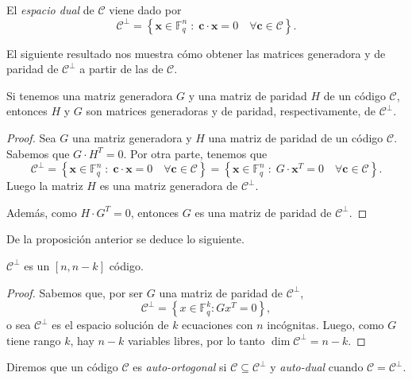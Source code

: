 \begin{definition}
    El \emph{espacio dual} de $\mathcal{C}$ viene dado por 
    \[
        \mathcal{C} ^{\perp} = \left\{ \mathbf{x} \in \mathbb{F}_q^n \; : \; \mathbf{c} \cdot \mathbf{x} = 0 \quad \forall \mathbf{c} \in \mathcal{C} \right\}.
    \]
\end{definition}

El siguiente resultado nos muestra cómo obtener las matrices generadora y de paridad de $\mathcal{C} ^{\perp}$ a partir de las de $\mathcal{C}$.

\begin{proposition}
    Si tenemos una matriz generadora $G$ y una matriz de paridad $H$ de un código $\mathcal{C}$, entonces $H$ y $G$ son matrices generadoras y de paridad, respectivamente, de $\mathcal{C} ^{\perp}$.
\end{proposition}

\begin{proof}
    Sea $G$ una matriz generadora y $H$ una matriz de paridad de un código $\mathcal{C}$. Sabemos que $G \cdot H^T = 0$. Por otra parte, tenemos que
    \[
        \mathcal{C} ^{\perp} = \left\{ \mathbf{x} \in \mathbb{F}_q^n \; : \;  \mathbf{c} \cdot \mathbf{x} = 0 \quad \forall \mathbf{c} \in \mathcal{C} \right\} = \left\{ \mathbf{x} \in \mathbb{F}_q^n \; : \; G \cdot \mathbf{x}^T = 0 \quad \forall \mathbf{c} \in \mathcal{C} \right\}.
    \]
    Luego la matriz $H$ es una matriz generadora de $\mathcal{C} ^{\perp}$.

    Además, como $H \cdot G^T = 0$, entonces $G$ es una matriz de paridad de $\mathcal{C} ^{\perp}$.
\end{proof}

De la proposición anterior se deduce lo siguiente.

\begin{proposition}
    $\mathcal{C} ^{\perp}$ es un $[n,n-k]$ código.
\end{proposition}

\begin{proof}
    Sabemos que, por ser $G$ una matriz de paridad de $\mathcal{C} ^{\perp}$, 
    \[
        \mathcal{C} ^{\perp} = \left\{ x \in \mathbb{F}_q^k : Gx^T = 0 \right\},
    \]
    o sea $\mathcal{C} ^{\perp}$ es el espacio solución de $k$ ecuaciones con $n$ incógnitas. Luego, como $G$ tiene rango $k$, hay $n - k$ variables libres, por lo tanto $\dim \mathcal{C} ^{\perp} = n - k$.
\end{proof}

Diremos que un código $\mathcal{C}$ es \emph{auto-ortogonal} si $\mathcal{C} \subseteq \mathcal{C} ^{\perp}$ y \emph{auto-dual} cuando $\mathcal{C} = \mathcal{C} ^{\perp}$.

